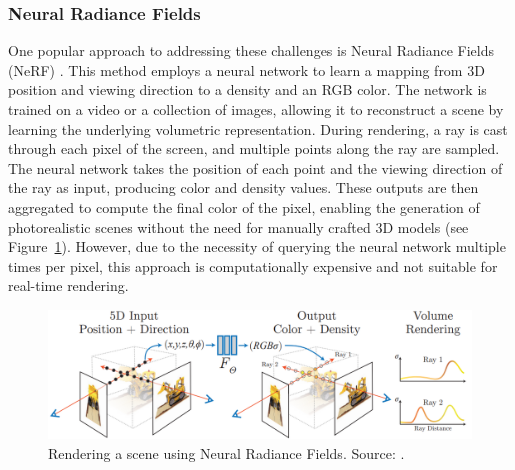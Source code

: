 \documentclass[12pt]{article}
\begin{document}
\subsubsection{Neural Radiance Fields}
One popular approach to addressing these challenges is Neural Radiance Fields (NeRF) \cite{Nerf}. This method employs a neural network to learn a mapping from 3D position and viewing direction to a density and an RGB color. The network is trained on a video or a collection of images, allowing it to reconstruct a scene by learning the underlying volumetric representation. During rendering, a ray is cast through each pixel of the screen, and multiple points along the ray are sampled. The neural network takes the position of each point and the viewing direction of the ray as input, producing color and density values. These outputs are then aggregated to compute the final color of the pixel, enabling the generation of photorealistic scenes without the need for manually crafted 3D models (see Figure~\ref{fig:nerf}). However, due to the necessity of querying the neural network multiple times per pixel, this approach is computationally expensive and not suitable for real-time rendering.
\begin{figure}[h!]
	\centering
	\includegraphics[width=\textwidth]{Images/Nerf.png}
	\caption{Rendering a scene using Neural Radiance Fields. Source: \cite{Nerf}.}
	\label{fig:nerf}
\end{figure}
\end{document}
